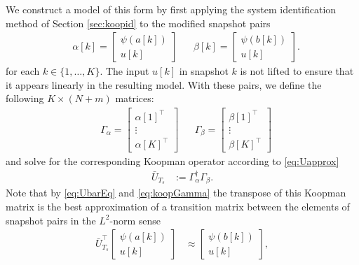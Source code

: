 We construct a model of this form by first applying the system identification method of Section \ref{sec:koopid} to the modified snapshot pairs
\begin{align}
    &\alpha[k] = \begin{bmatrix} \psi(a[k]) \\ u[k] \end{bmatrix} 
    &&\beta[k] = \begin{bmatrix} \psi(b[k]) \\ u[k] \end{bmatrix}.
    \label{eq:alpha}
\end{align}
for each $k \in \{1,\ldots,K\}$. 
The input $u[k]$ in snapshot $k$ is not lifted to ensure that it appears linearly in the resulting model.
With these pairs, we define the following ${K \times (N + m)}$ matrices:
\begin{align}
    &\Gamma_\alpha = \begin{bmatrix} \alpha[1]^\top \\ \vdots \\  \alpha[K]^\top \end{bmatrix}
    &&\Gamma_\beta = \begin{bmatrix} \beta[1]^\top \\ \vdots \\  \beta[K]^\top \end{bmatrix}
    \label{eq:Gamma}
\end{align}
and solve for the corresponding Koopman operator according to \eqref{eq:Uapprox}
\begin{align}
    \bar{U}_{T_s} &:= \Gamma_{\alpha}^\dagger \Gamma_\beta.
    \label{eq:koopGamma}
\end{align}
Note that by \eqref{eq:UbarEq} and \eqref{eq:koopGamma} the transpose of this Koopman matrix is the best approximation of a transition matrix between the elements of snapshot pairs in the $L^2$-norm sense \
\begin{align}
    \bar{U}_{T_s}^\top 
    \begin{bmatrix} \psi(a[k]) \\ u[k] \end{bmatrix} &\approx
    \begin{bmatrix} \psi(b[k]) \\ u[k] \end{bmatrix},
\end{align}
